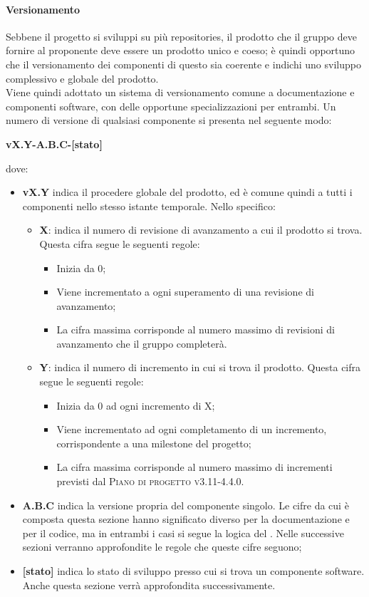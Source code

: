 \documentclass[../norme-di-progetto.tex]{subfiles}
\begin{document}
\paragraph{Versionamento}
Sebbene il progetto si sviluppi su più repositories, il prodotto che il gruppo deve fornire al proponente deve essere un prodotto unico e coeso; è quindi opportuno che il versionamento dei componenti di questo sia coerente e indichi uno sviluppo complessivo e globale del prodotto. \\
Viene quindi adottato un sistema di versionamento comune a documentazione e componenti software, con delle opportune specializzazioni per entrambi. Un numero di versione di qualsiasi componente si presenta nel seguente modo:
\begin{center}
  \centering
  \textbf{vX.Y-A.B.C-[stato]}
\end{center} dove:
\begin{itemize}
  \item \textbf{vX.Y} indica il procedere globale del prodotto, ed è comune quindi a tutti i componenti nello stesso istante temporale. Nello specifico:
  \begin{itemize}
    \item \textbf{X}: indica il numero di revisione di avanzamento a cui il prodotto si trova. Questa cifra segue le seguenti regole:
    \begin{itemize}
      \item Inizia da 0;
      \item Viene incrementato a ogni superamento di una revisione di avanzamento;
      \item La cifra massima corrisponde al numero massimo di revisioni di avanzamento che il gruppo completerà.
    \end{itemize}
    \item \textbf{Y}: indica il numero di incremento in cui si trova il prodotto. Questa cifra segue le seguenti regole:
    \begin{itemize}
      \item Inizia da 0 ad ogni incremento di X;
      \item Viene incrementato ad ogni completamento di un incremento, corrispondente a una milestone del progetto;
      \item La cifra massima corrisponde al numero massimo di incrementi previsti dal \textsc{Piano di progetto v3.11-4.4.0}.
    \end{itemize}
  \end{itemize}
  \item \textbf{A.B.C} indica la versione propria del componente singolo. Le cifre da cui è composta questa sezione hanno significato diverso per la documentazione e per il codice, ma in entrambi i casi si segue la logica del . Nelle successive sezioni verranno approfondite le regole che queste cifre seguono;
  \item \textbf{[stato]} indica lo stato di sviluppo presso cui si trova un componente software. Anche questa sezione verrà approfondita successivamente.
\end{itemize}
\end{document}
